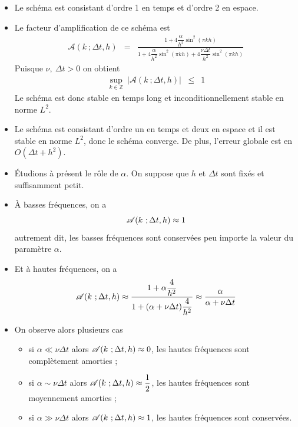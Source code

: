 \begin{frame}
    \begin{itemize}
        \item Le schéma est consistant d'ordre 1 en temps et d'ordre 2 en espace. 
        \item Le facteur d'amplification de ce schéma est
        \begin{eqnarray*}
    \mathscr{A}(k \ ; \Delta t ,h) &=& \frac{1 +  4 \dfrac{\alpha}{h^2} \sin^2(\pi k h)}{1+4\dfrac{\alpha}{h^2}\sin^2(\pi k h) + 4 \dfrac{\nu \Delta t}{h^2}\sin^2(\pi k h) }
\end{eqnarray*}
Puisque $\nu, \ \Delta t > 0$ on obtient 
\begin{eqnarray*}
    \sup_{k \in \mathbb{Z}} \ |\mathscr{A}(k \ ; \Delta t ,h)| &\leq& 1
\end{eqnarray*}
Le schéma est donc stable en temps long et inconditionnellement stable en norme $L^2$. 
\item Le schéma est consistant d'ordre un en temps et deux en espace et il est
stable en norme $L^2$, donc le schéma converge. De plus, l'erreur globale est en $O(\Delta t +h^2)$.
    \end{itemize}
\end{frame}

\begin{frame}
    \begin{itemize}
        \item \'Etudions à présent le rôle de $\alpha$. On suppose que $h$ et 
$\Delta t$ sont fixés et suffisamment petit. 
\item \`A basses fréquences, on a 
\begin{equation*}
    \scrA (k \ ; \Delta t ,h) \approx 1
\end{equation*}
autrement dit, les basses fréquences sont conservées peu importe la valeur du paramètre $\alpha$. 
\item Et à hautes fréquences, on a 
\begin{equation*}
    \mathscr{A}(k \ ; \Delta t ,h) \approx \dfrac{1+\alpha\dfrac{4}{h^2}}{1+(\alpha+\nu\Delta t)\dfrac{4}{h^2}} \approx \dfrac{\alpha}{\alpha+\nu\Delta t}
\end{equation*}
\item On observe alors plusieurs cas
\begin{itemize}
    \item[$\triangleright$] si $\alpha \ll \nu \Delta t$ alors $\mathscr{A}(k \ ; \Delta t ,h) \approx 0$, les hautes fréquences sont complètement amorties ; 
    \item[$\triangleright$] si $\alpha \sim \nu \Delta t$ alors $\mathscr{A}(k \ ; \Delta t ,h) \approx \dfrac{1}{2}$, les hautes fréquences sont moyennement amorties ; 
    \item[$\triangleright$] si $\alpha \gg \nu\Delta t$ alors $\mathscr{A}(k \ ; \Delta t ,h) \approx 1$,
    les hautes fréquences sont conservées.
\end{itemize}
    \end{itemize}
\end{frame}


